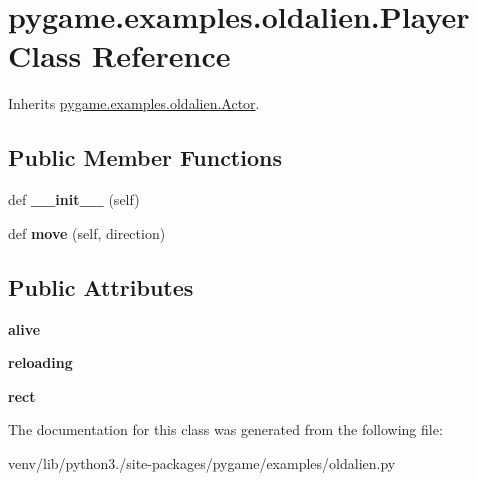 \hypertarget{classpygame_1_1examples_1_1oldalien_1_1_player}{}\section{pygame.\+examples.\+oldalien.\+Player Class Reference}
\label{classpygame_1_1examples_1_1oldalien_1_1_player}


Inherits \hyperlink{classpygame_1_1examples_1_1oldalien_1_1_actor}{pygame.\+examples.\+oldalien.\+Actor}.

\subsection*{Public Member Functions}
\begin{DoxyCompactItemize}
\item 
\mbox{\label{classpygame_1_1examples_1_1oldalien_1_1_player_a9ca5ae03d91065250820dd80a12f3835}} 
def {\bfseries \+\_\+\+\_\+init\+\_\+\+\_\+} (self)
\item 
\mbox{\label{classpygame_1_1examples_1_1oldalien_1_1_player_a18d81a7199d8c057c390f4f60b71913c}} 
def {\bfseries move} (self, direction)
\end{DoxyCompactItemize}
\subsection*{Public Attributes}
\begin{DoxyCompactItemize}
\item 
\mbox{\label{classpygame_1_1examples_1_1oldalien_1_1_player_a15f902e8eed496d5c334f24d20d19672}} 
{\bfseries alive}
\item 
\mbox{\label{classpygame_1_1examples_1_1oldalien_1_1_player_a1c74d1c8a68fd3ea67240730390c9f2c}} 
{\bfseries reloading}
\item 
\mbox{\label{classpygame_1_1examples_1_1oldalien_1_1_player_a844fe00c9f354b2be37439da3f757da7}} 
{\bfseries rect}
\end{DoxyCompactItemize}


The documentation for this class was generated from the following file\+:\begin{DoxyCompactItemize}
\item 
venv/lib/python3./site-\/packages/pygame/examples/oldalien.\+py\end{DoxyCompactItemize}
